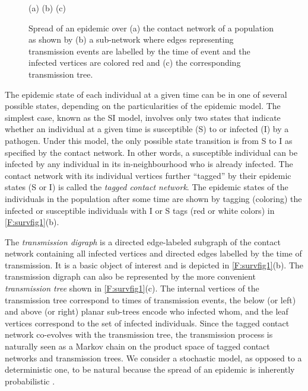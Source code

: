\documentclass[review]{elsarticle}
\numberwithin{equation}{section}
\let\orgautoref\autoref
\renewcommand{\autoref}
        {\def\equationautorefname{Eq.}%
         \def\figureautorefname{Fig.}%
         \def\subfigureautorefname{Fig.}%
         \def\sectionautorefname{Sect.}%
         \def\subsectionautorefname{Sect.}%
         \def\subsubsectionautorefname{Sect.}%
         \def\Itemautorefname{item}%
         \def\tableautorefname{Table}%
         \def\propositionautorefname{Prop.}%
         \def\corollaryautorefname{Corollary}%
         \def\theoremautorefname{Theorem}%
         \def\remarkautorefname{Remark}%
         \def\lemmaautorefname{Lemma}%
         \def\proofofautorefname{Proof}%
         \def\exampleautorefname{Example}%
         \orgautoref}
\begin{document}
\begin{figure}[htbp]
\begin{center}
\begin{center}
(a)\scalebox{.90}{}\qquad
(b)\scalebox{.90}{}\qquad
(c) \scalebox{.50}{}
\end{center}
\caption{Spread of an epidemic over (a) the contact network of a population as shown by (b) a sub-network where edges representing transmission events are labelled by the time of event and the infected vertices are colored red and (c) the corresponding transmission tree.\label{F:survfig1}}
\end{center}
\end{figure}

The epidemic state of each individual at a given time can be in one of several possible states, depending on the particularities of the epidemic model.  
The simplest case, known as the SI model, involves only two states that indicate whether an individual at a given time is susceptible (S) to or infected (I) by a pathogen.  
Under this model, the only possible state transition is from S to I as specified by the contact network.  
In other words, a susceptible individual can be infected by any individual in its in-neighbourhood who is already infected.  
The contact network with its individual vertices further ``tagged'' by their epidemic states (S or I) is called the {\em tagged contact network}. 
The epidemic states of the individuals in the population after some time are shown by tagging (coloring) the infected or susceptible individuals with I or S tags (red or white colors) in \autoref{F:survfig1}(b). 
  
The {\em transmission digraph} is a directed edge-labeled subgraph of the contact network containing all infected vertices and directed edges labelled by the time of transmission.  It is a basic object of interest and is depicted in \autoref{F:survfig1}(b).  
The transmission digraph can also be represented by the more convenient {\em transmission tree} shown in \autoref{F:survfig1}(c).  
The internal vertices of the transmission tree correspond to times of transmission events, the below (or left) and above (or right) planar sub-trees encode who infected whom, and the leaf vertices correspond to the set of infected individuals.  
Since the tagged contact network co-evolves with the transmission tree, the transmission process is naturally seen as a Markov chain on the product space of tagged contact networks and transmission trees. 
We consider a stochastic model, as opposed to a deterministic one, to be natural because the spread of an epidemic is inherently probabilistic \citep{andersson2000}.  
\end{document}
